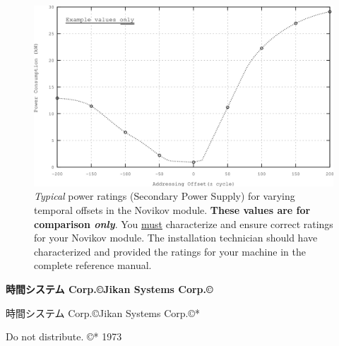 \documentclass[a4paper,onecolumn,final,10pt]{memoir}
\makeatletter
\let\@copyright@old\copyright
\def\@copyright@new{\makebox[.6ex][l]{\hspace{-.4ex}\textsuperscript{\@copyright@old}}}
\def\copyright{\@ifstar\@copyright@old\@copyright@new}
\def\@companyname@english{Jikan Systems Corp.\copyright}
\def\@companyname@japanese{時間システム Corp.\copyright}
\def\companyname{\@ifstar\@companyname@japanese\@companyname@english}
\makeatother
\begin{document}
\begin{figure}
	\centerline{%
		\includegraphics{assets/novikov-power.png}%
	}
	\caption{\emph{Typical} power ratings (Secondary Power Supply) for varying temporal
		offsets in the Novikov module. \textbf{These values are for comparison
		\emph{only}}. You \underline{must} characterize and ensure correct
		ratings for your Novikov module. The installation technician should have
		characterized and provided the ratings for your machine in the complete
		reference manual.}
	\label{fig:novikov-power}
\end{figure}

\clearpage
\thispagestyle{empty}
\null\vfill
{\bfseries
\null\hfill\companyname{}\hfill\null

\null\hfill\companyname*{}\hfill\null}
\vfill\null

\centerline{\ttfamily Do not distribute. \copyright*{} 1973}
\end{document}
